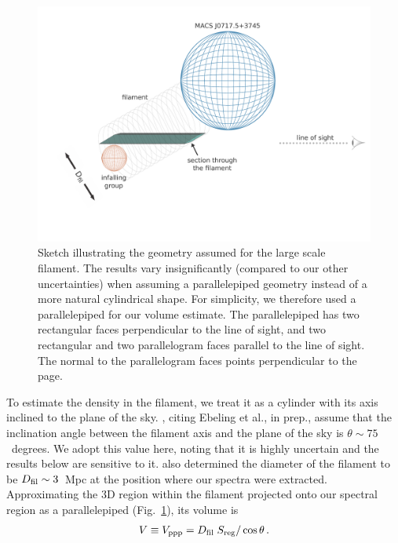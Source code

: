 \documentclass[11pt,a4paper,useAMS,iop]{emulateapj}
\begin{document}
\begin{figure}
	\includegraphics[width=\columnwidth, trim=0 2.5cm 0 1cm, clip=True]{plots/fil-macsj0717-sketch.pdf}
	\caption{Sketch illustrating the geometry assumed for the large scale filament. The results vary insignificantly (compared to our other uncertainties) when assuming a parallelepiped geometry instead of a more natural cylindrical shape. For simplicity, we therefore used a parallelepiped for our volume estimate. The parallelepiped has two rectangular faces perpendicular to the line of sight, and two rectangular and two parallelogram faces parallel to the line of sight. The normal to the parallelogram faces points perpendicular to the page.  \label{fig:sketch}}
\end{figure}

To estimate the density in the filament, we treat it as a cylinder with its axis inclined to the plane of the sky. \citet{Jauzac2012}, citing Ebeling et al., in prep., assume that the inclination angle between the filament axis and the plane of the sky is $\theta \sim 75$~degrees. We adopt this value here, noting that it is highly uncertain and the results below are sensitive to it. \citet{Jauzac2012} also determined the diameter of the filament to be $D_{\rm fil} \sim 3$~Mpc at the position where our spectra were extracted. Approximating the 3D region within the filament projected onto our spectral region as a parallelepiped (Fig.~\ref{fig:sketch}), its volume is 
\begin{eqnarray}
    V \equiv V_{\rm ppp} = D_{\rm fil} \; S_{\rm reg} / \cos\theta\,  . 
\label{eq:v_ppp}
\end{eqnarray}
\end{document}
